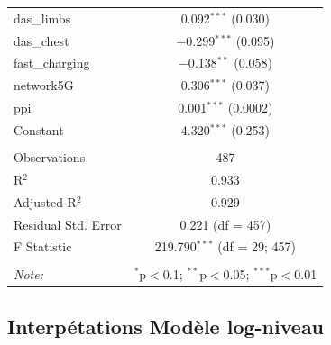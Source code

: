 \documentclass[
  12pt,
]{report}
\begin{document}
\begin{table}[!htbp]
\begin{tabular}{@{\extracolsep{5pt}}lc}
  das\_limbs & 0.092$^{***}$ (0.030) \\ 
  das\_chest & $-$0.299$^{***}$ (0.095) \\ 
  fast\_charging & $-$0.138$^{**}$ (0.058) \\ 
  network5G & 0.306$^{***}$ (0.037) \\ 
  ppi & 0.001$^{***}$ (0.0002) \\ 
  Constant & 4.320$^{***}$ (0.253) \\ 
 \hline \\[-1.8ex] 
Observations & 487 \\ 
R$^{2}$ & 0.933 \\ 
Adjusted R$^{2}$ & 0.929 \\ 
Residual Std. Error & 0.221 (df = 457) \\ 
F Statistic & 219.790$^{***}$ (df = 29; 457) \\ 
\hline 
\hline \\[-1.8ex] 
\textit{Note:}  & \multicolumn{1}{r}{$^{*}$p$<$0.1; $^{**}$p$<$0.05; $^{***}$p$<$0.01} \\ 
\end{tabular} 
\end{table}

\newpage

\subsection{Interpétations Modèle
log-niveau}\label{interpuxe9tations-moduxe8le-log-niveau}
\end{document}
